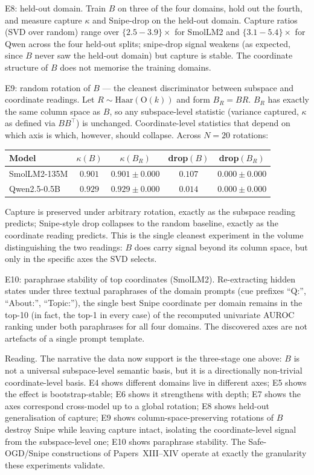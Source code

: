 \documentclass[11pt]{article}
\begin{document}
E8: held-out domain.
Train $B$ on three of the four domains, hold out the fourth, and
measure capture $\kappa$ and Snipe-drop on the held-out domain.
Capture ratios (SVD over random) range over
$\{2.5{-}3.9\}\times$ for SmolLM2 and
$\{3.1{-}5.4\}\times$ for Qwen across the four held-out splits;
snipe-drop signal weakens (as expected, since $B$ never saw the
held-out domain) but capture is stable. The coordinate structure of
$B$ does not memorise the training domains.

E9: random rotation of $B$ --- the cleanest discriminator
between subspace and coordinate readings.
Let $R \sim \mathrm{Haar}(\mathrm{O}(k))$ and form $B_R = B R$.
$B_R$ has exactly the same column space as $B$, so any
subspace-level statistic (variance captured, $\kappa$ as defined
via $B B^\top$) is unchanged. Coordinate-level statistics that depend
on which axis is which, however, should collapse. Across
$N{=}20$ rotations:
\begin{center}
\begin{tabular}{lcccc}
\toprule
Model & $\kappa(B)$ & $\kappa(B_R)$ & drop$(B)$ & drop$(B_R)$ \\
\midrule
SmolLM2-135M & $0.901$ & $0.901 \pm 0.000$ & $0.107$ & $0.000 \pm 0.000$ \\
Qwen2.5-0.5B & $0.929$ & $0.929 \pm 0.000$ & $0.014$ & $0.000 \pm 0.000$ \\
\bottomrule
\end{tabular}
\end{center}
Capture is preserved under arbitrary rotation, exactly as the
subspace reading predicts; Snipe-style drop collapses to the random
baseline, exactly as the coordinate reading predicts. This is the
single cleanest experiment in the volume distinguishing the two
readings: $B$ does carry signal beyond its column space, but only
in the specific axes the SVD selects.

E10: paraphrase stability of top coordinates (SmolLM2).
Re-extracting hidden states under three textual paraphrases of the
domain prompts (cue prefixes ``Q:'', ``About:'', ``Topic:''), the
single best Snipe coordinate per domain remains in the top-10 (in
fact, the top-1 in every case) of the recomputed univariate AUROC
ranking under both paraphrases for all four domains. The discovered
axes are not artefacts of a single prompt template.

Reading. The narrative the data now support is the
three-stage one above: $B$ is not a universal subspace-level
semantic basis, but it is a directionally non-trivial
coordinate-level basis. E4 shows different domains live in
different axes; E5 shows the effect is bootstrap-stable; E6 shows it
strengthens with depth; E7 shows the axes correspond cross-model up
to a global rotation; E8 shows held-out generalisation of capture;
E9 shows column-space-preserving rotations of $B$ destroy Snipe
while leaving capture intact, isolating the coordinate-level signal
from the subspace-level one; E10 shows paraphrase stability. The
Safe-OGD/Snipe constructions of Papers~XIII--XIV operate at exactly
the granularity these experiments validate.
\end{document}
